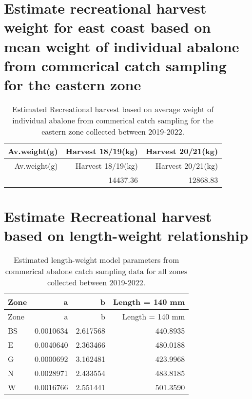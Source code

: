 \documentclass[
  11pt,
]{article}
\begin{document}
\section{Estimate recreational harvest weight for east coast based on
mean weight of individual abalone from commerical catch sampling for the
eastern
zone}\label{estimate-recreational-harvest-weight-for-east-coast-based-on-mean-weight-of-individual-abalone-from-commerical-catch-sampling-for-the-eastern-zone}

\begin{longtable}[]{@{}rrr@{}}
\caption{Estimated Recreational harvest based on average weight of
individual abalone from commerical catch sampling for the eastern zone
collected between 2019-2022.}\tabularnewline
\toprule\noalign{}
Av.weight(g) & Harvest 18/19(kg) & Harvest 20/21(kg) \\
\midrule\noalign{}
\endfirsthead
\toprule\noalign{}
Av.weight(g) & Harvest 18/19(kg) & Harvest 20/21(kg) \\
\midrule\noalign{}
\endhead
\bottomrule\noalign{}
\endlastfoot
562.3997 & 14437.36 & 12868.83 \\
\end{longtable}

\section{Estimate Recreational harvest based on length-weight
relationship}\label{estimate-recreational-harvest-based-on-length-weight-relationship}

\begin{longtable}[]{@{}lrrr@{}}
\caption{Estimated length-weight model parameters from commerical
abalone catch sampling data for all zones collected between
2019-2022.}\tabularnewline
\toprule\noalign{}
Zone & a & b & Length = 140 mm \\
\midrule\noalign{}
\endfirsthead
\toprule\noalign{}
Zone & a & b & Length = 140 mm \\
\midrule\noalign{}
\endhead
\bottomrule\noalign{}
\endlastfoot
BS & 0.0010634 & 2.617568 & 440.8935 \\
E & 0.0040640 & 2.363466 & 480.0188 \\
G & 0.0000692 & 3.162481 & 423.9968 \\
N & 0.0028971 & 2.433554 & 483.8185 \\
W & 0.0016766 & 2.551441 & 501.3590 \\
\end{longtable}
\end{document}
